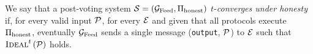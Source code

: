 \begin{definition}
  We say that a post-voting system $\mathcal{S} = \left(\mathcal{G}_{\mathrm{Feed}}, \Pi_{\mathrm{honest}}\right)$
  $t$-\emph{converges under honesty} if, for every valid input
  $\mathcal{P}$, for every $\mathcal{E}$ and given that all protocols execute
  $\Pi_{\mathrm{honest}}$, eventually $\mathcal{G}_{\mathrm{Feed}}$ sends a single message (\texttt{output},
  $\mathcal{P}$) to $\mathcal{E}$ such that $\textsc{Ideal}^t\left(\mathcal{P}\right)$
  holds.
\end{definition}

